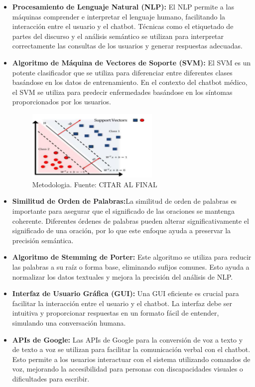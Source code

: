 \begin{itemize}
	\item \textbf{Procesamiento de Lenguaje Natural (NLP):} El NLP permite a las máquinas comprender e interpretar el lenguaje humano, facilitando la interacción entre el usuario y el chatbot. Técnicas como el etiquetado de partes del discurso y el análisis semántico se utilizan para interpretar correctamente las consultas de los usuarios y generar respuestas adecuadas.
	
	\item \textbf{Algoritmo de Máquina de Vectores de Soporte (SVM):} El SVM es un potente clasificador que se utiliza para diferenciar entre diferentes clases basándose en los datos de entrenamiento. En el contexto del chatbot médico, el SVM se utiliza para predecir enfermedades basándose en los síntomas proporcionados por los usuarios.
	
	\begin{figure}[h]
		\begin{center}
			\includegraphics[width=0.6\textwidth]{2/1_antecedentes/SVM-10.png}
			\caption{Metodologia. Fuente: CITAR AL FINAL }
		\end{center}
	\end{figure}
	
	\item \textbf{Similitud de Orden de Palabras:}La similitud de orden de palabras es importante para asegurar que el significado de las oraciones se mantenga coherente. Diferentes órdenes de palabras pueden alterar significativamente el significado de una oración, por lo que este enfoque ayuda a preservar la precisión semántica.
	
	\item \textbf{Algoritmo de Stemming de Porter:} Este algoritmo se utiliza para reducir las palabras a su raíz o forma base, eliminando sufijos comunes. Esto ayuda a normalizar los datos textuales y mejora la precisión del análisis de NLP.
	
	\item \textbf{Interfaz de Usuario Gráfica (GUI):} Una GUI eficiente es crucial para facilitar la interacción entre el usuario y el chatbot. La interfaz debe ser intuitiva y proporcionar respuestas en un formato fácil de entender, simulando una conversación humana.
	
	\item \textbf{APIs de Google:} Las APIs de Google para la conversión de voz a texto y de texto a voz se utilizan para facilitar la comunicación verbal con el chatbot. Esto permite a los usuarios interactuar con el sistema utilizando comandos de voz, mejorando la accesibilidad para personas con discapacidades visuales o dificultades para escribir.
\end{itemize}


